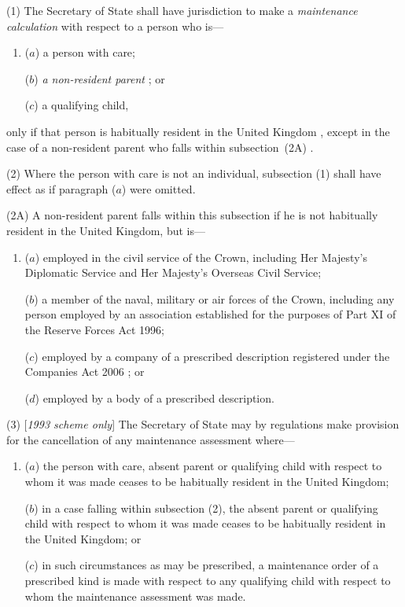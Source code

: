 \documentclass[12pt,a4paper]{article}
\begin{document}
(1) 
The 
Secretary of State  %
shall have jurisdiction to make a 
\emph{maintenance calculation}  %
with respect to a person who is—
\begin{enumerate}\item[]
($a$) a person with care;

($b$) 
\emph{a non-resident parent}%
; or

($c$) a qualifying child,
\end{enumerate}
only if that person is habitually resident in the United Kingdom%
, except in the case of a non-resident parent who falls within subsection~(2A)%
.

(2) Where the person with care is not an individual, subsection (1)  shall have effect as if paragraph ($a$)  were omitted.

(2A) A non-resident parent falls within this subsection if he is not habitually resident in the United Kingdom, but is—
\begin{enumerate}\item[]
($a$) employed in the civil service of the Crown, including Her Majesty’s Diplomatic Service and Her Majesty’s Overseas Civil Service;

($b$) a member of the naval, military or air forces of the Crown, including any person employed by an association established for the purposes of Part XI of the Reserve Forces Act 1996;

($c$) employed by a company of a prescribed description 
registered under the Companies Act 2006%
; or

($d$) employed by a body of a prescribed description.
\end{enumerate}

(3) [\emph{1993 scheme only}] The Secretary of State may by regulations make provision for the cancellation of any maintenance assessment where—
\begin{enumerate}\item[]
($a$) the person with care, absent parent or qualifying child with respect to whom it was made ceases to be habitually resident in the United Kingdom;

($b$) in a case falling within subsection (2), the absent parent or qualifying child with respect to whom it was made ceases to be habitually resident in the United Kingdom; or

($c$) in such circumstances as may be prescribed, a maintenance order of a prescribed kind is made with respect to any qualifying child with respect to whom the maintenance assessment was made.
\end{enumerate}
\end{document}
